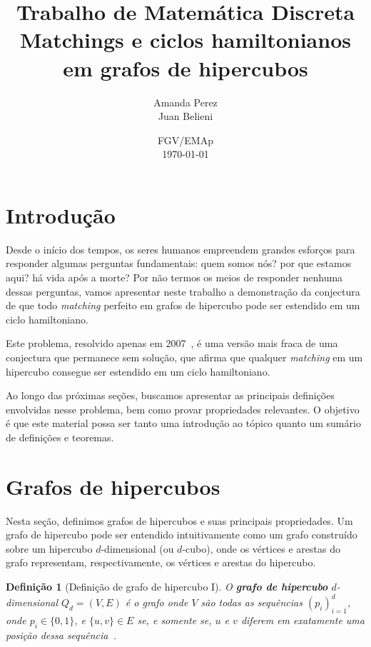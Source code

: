 \documentclass[12pt, a4paper]{article}
\title{Trabalho de Matemática Discreta\\
\Large{Matchings e ciclos hamiltonianos em grafos de hipercubos}}
\author{
    Amanda Perez \\
    Juan Belieni
}
\date{
    FGV/EMAp \\
    \today
}
\newtheorem{definition}{Definição}[section]
\begin{document}
\maketitle

\section{Introdução}

Desde o início dos tempos, os seres humanos empreendem grandes esforços para responder algumas perguntas fundamentais: quem somos nós? por que estamos aqui? há vida após a morte? Por não termos os meios de responder nenhuma dessas perguntas, vamos apresentar neste trabalho a demonstração da conjectura de que todo \textit{matching} perfeito em grafos de hipercubo pode ser estendido em um ciclo hamiltoniano.

Este problema, resolvido apenas em 2007~\cite{fink_perfect_2007}, é uma versão mais fraca de uma conjectura que permanece sem solução, que afirma que qualquer \textit{matching} em um hipercubo consegue ser estendido em um ciclo hamiltoniano.

Ao longo das próximas seções, buscamos apresentar as principais definições envolvidas nesse problema, bem como provar propriedades relevantes. O objetivo é que este material possa ser tanto uma introdução ao tópico quanto um sumário de definições e teoremas.

\section{Grafos de hipercubos}

Nesta seção, definimos grafos de hipercubos e suas principais propriedades. Um grafo de hipercubo pode ser entendido intuitivamente como um grafo construído sobre um hipercubo $d$-dimensional (ou $d$-cubo), onde os vértices e arestas do grafo representam, respectivamente, os vértices e arestas do hipercubo.

\begin{definition}[Definição de grafo de hipercubo I] \label{def:hyper-i}
    O {\bf grafo de hipercubo} $d$-dimensional $Q_d = (V, E)$ é o grafo onde $V$ são todas as sequências $( p_i )_{i = 1}^d$, onde $p_i \in \{ 0, 1 \}$, e $\{ u, v \} \in E$ se, e somente se, $u$ e $v$ diferem em exatamente uma posição dessa sequência~\cite[p.~97]{socorro_rangel_elementos_2018}.
\end{definition}
\end{document}
